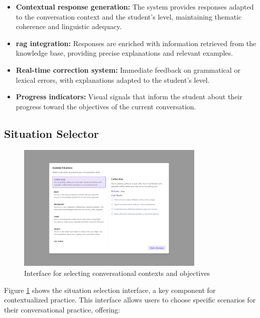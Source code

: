 \begin{itemize}
    \item \textbf{Contextual response generation:} The system provides responses adapted to the conversation context and the student's level, maintaining thematic coherence and linguistic adequacy.
    
    \item \textbf{\gls{rag} integration:} Responses are enriched with information retrieved from the knowledge base, providing precise explanations and relevant examples.
    
    \item \textbf{Real-time correction system:} Immediate feedback on grammatical or lexical errors, with explanations adapted to the student's level.
    
    \item \textbf{Progress indicators:} Visual signals that inform the student about their progress toward the objectives of the current conversation.
\end{itemize}

\subsection{Situation Selector}
\label{selector-situaciones}

\begin{figure}[H]
    \centering
    \includegraphics[width=0.8\textwidth]{figuras/screenshots/situation-picker.png}
    \caption{Interface for selecting conversational contexts and objectives}
    \label{fig:situation-picker}
\end{figure}

Figure \ref{fig:situation-picker} shows the situation selection interface, a key component for contextualized practice. This interface allows users to choose specific scenarios for their conversational practice, offering:

